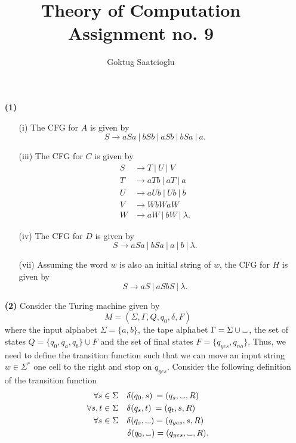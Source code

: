 \documentclass [10pt]{article}
\newcommand\vartextvisiblespace[1][.7em]{%
  \makebox[#1]{%
    \kern.07em
    \vrule height.3ex
    \hrulefill
    \vrule height.3ex
    \kern.07em
  }%
}
\newcommand{\spacechar}{\vartextvisiblespace}%
\begin{document}
\title{Theory of Computation Assignment no. 9}
\author{Goktug Saatcioglu}
\date{}
\maketitle

\begin{enumerate}
	\item[\textbf{(1)}]
	\begin{enumerate}
		\item[(i)]The CFG for $A$ is given by$$S\rightarrow aSa\:|\:bSb\:|\:aSb\:|\:bSa\:|\:a.$$
		\item[(iii)]The CFG for $C$ is given by
		\begin{align}
			S &\rightarrow T\:|\:U\:|\:V \nonumber\\
			T &\rightarrow aTb\:|\:aT\:|\:a \nonumber\\
			U &\rightarrow aUb\:|\:Ub\:|\:b \nonumber \\
			V &\rightarrow WbWaW \nonumber\\
			W &\rightarrow aW\:|\:bW\:|\:\lambda. \nonumber
		\end{align}
		\item[(iv)]The CFG for $D$ is given by$$S\rightarrow aSa\:|\:bSa\:|\:a\:|\:b\:|\:\lambda.$$
		\item[(vii)]Assuming the word $w$ is also an initial string of $w$, the CFG for $H$ is given by$$S\rightarrow aS\:|\:aSbS\:|\:\lambda.$$
	\end{enumerate}
	\item[\textbf{(2)}]Consider the Turing machine given by$$M=(\Sigma,\Gamma,Q,q_{0},\delta,F)$$where the input alphabet $\Sigma=\{a,b\}$, the tape alphabet $\Gamma=\Sigma\cup\mathtt{\spacechar}$, the set of states $Q=\{q_{0},q_{a},q_{b}\}\cup F$ and the set of final states $F=\{q_{yes},q_{no}\}$. Thus, we need to define the transition function such that we can move an input string $w\in\Sigma^{*}$ one cell to the right and stop on $q_{yes}$. Consider the following definition of the transition function
	\begin{align}
		\forall s&\in\Sigma\quad\delta(q_{0},s)\:=(q_{s},\mathtt{\spacechar},R)\nonumber\\
		\forall s,t&\in\Sigma\quad\delta(q_{s},t)\:=(q_{t},s,R)\nonumber\\
		\forall s&\in\Sigma\quad\delta(q_{s},\mathtt{\spacechar})=(q_{yes},s,R)\nonumber\\
		&\quad\quad\quad\delta(q_{0},\mathtt{\spacechar})=(q_{yes},\mathtt{\spacechar},R).\nonumber

\end{align}
\end{enumerate}
\end{document}
